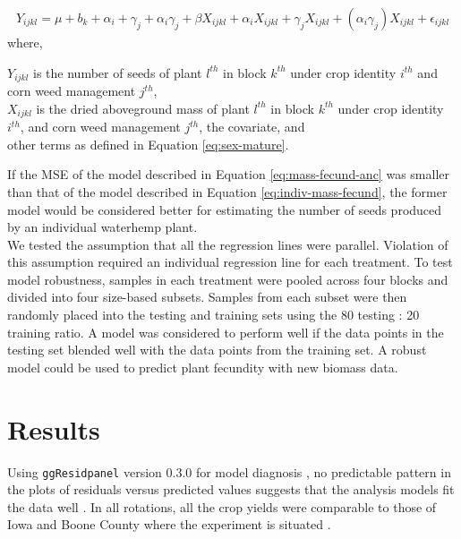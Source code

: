 \documentclass[utf8]{frontiersSCNS}
\begin{document}
\begin{align} 
Y_{ijkl} = \mu + b_k + \alpha_i + \gamma_j +\alpha_i \gamma_j + \beta X_{ijkl} + \alpha_i X_{ijkl} + \gamma_j X_{ijkl} + (\alpha_i \gamma_j)X_{ijkl} + \epsilon_{ijkl} \label{eq:mass-fecund-anc}
\end{align}
where,

\(Y_{ijkl}\) is the number of seeds of plant \(l^{th}\) in block \(k^{th}\) under crop identity \(i^{th}\) and corn weed management \(j^{th}\),\\
\(X_{ijkl}\) is the dried aboveground mass of plant \(l^{th}\) in block \(k^{th}\) under crop identity \(i^{th}\), and corn weed management \(j^{th}\), the covariate, and\\
other terms as defined in Equation \eqref{eq:sex-mature}.

If the MSE of the model described in Equation \eqref{eq:mass-fecund-anc} was smaller than that of the model described in Equation \eqref{eq:indiv-mass-fecund}, the former model would be considered better for estimating the number of seeds produced by an individual waterhemp plant.\\  
We tested the assumption that all the regression lines were parallel. Violation of this assumption required an individual regression line for each treatment.
To test model robustness, samples in each treatment were pooled across four blocks and divided into four size-based subsets. Samples from each subset were then randomly placed into the testing and training sets using the 80 testing : 20 training ratio. A model was considered to perform well if the data points in the testing set blended well with the data points from the training set. A robust model could be used to predict plant fecundity with new biomass data.

\hypertarget{results}{%
\section*{Results}\label{results}}

Using \texttt{ggResidpanel} version 0.3.0 for model diagnosis \citep{goodeGgResidpanelPanelsInteractive2019}, no predictable pattern in the plots of residuals versus predicted values suggests that the analysis models fit the data well \citep{nguyenCommonWaterhempIndividual2022}. In all rotations, all the crop yields were comparable to those of Iowa and Boone County where the experiment is situated \citep{nguyenWeedCommunityCompositioninpreparation, huntFossilEnergyUse2020}.
\end{document}

